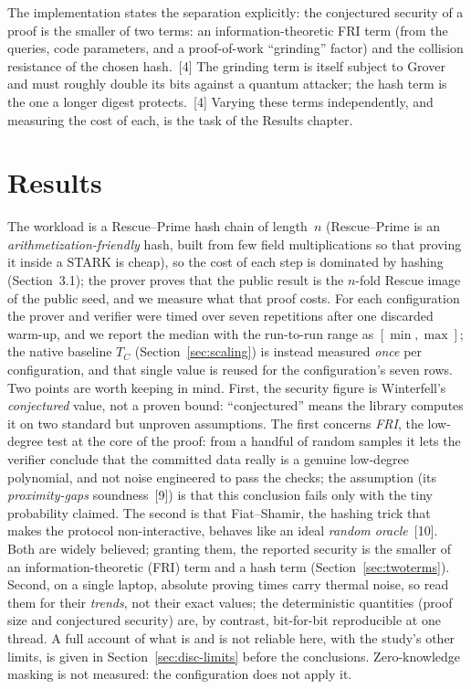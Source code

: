 \documentclass[11pt]{article}
\begin{document}
The implementation states the separation explicitly: the conjectured security of a proof is the smaller
of two terms: an information-theoretic FRI term (from the queries, code parameters, and a proof-of-work
``grinding'' factor) and the collision resistance of the chosen hash.~[4] The grinding term is itself
subject to Grover and must roughly double its bits against a quantum attacker; the hash term is the one a
longer digest protects.~[4] Varying these terms independently, and measuring the cost of each, is the
task of the Results chapter.

\section{Results}
\label{sec:results}

The workload is a Rescue--Prime hash chain of length~$n$ (Rescue--Prime is an
\emph{arithmetization-friendly} hash, built from few field multiplications so that proving it inside a
STARK is cheap), so the cost of each step is dominated by hashing (Section~3.1); the prover proves that the public result is the $n$-fold Rescue image of the
public seed, and we measure what that proof costs. For each configuration the prover and verifier were
timed over seven repetitions after one discarded warm-up, and we report the median with the run-to-run
range as $[\min,\max]$; the native baseline $T_C$ (Section~\ref{sec:scaling}) is instead measured
\emph{once} per configuration, and that single value is reused for the configuration's seven rows. Two points
are worth keeping in mind. First, the security figure is Winterfell's \emph{conjectured} value, not a
proven bound: ``conjectured'' means the library computes it on two standard but unproven assumptions. The
first concerns \emph{FRI}, the low-degree test at the core of the proof: from a handful of random samples
it lets the verifier conclude that the committed data really is a genuine low-degree polynomial, and not
noise engineered to pass the checks; the assumption (its \emph{proximity-gaps} soundness~[9]) is that
this conclusion fails only with the tiny probability claimed. The second is that Fiat--Shamir, the
hashing trick that makes the protocol non-interactive, behaves like an ideal \emph{random oracle}~[10].
Both are widely believed; granting them, the reported security is the smaller of an information-theoretic
(FRI) term and a hash term (Section~\ref{sec:twoterms}). Second, on a single laptop, absolute proving
times carry thermal noise, so read them for their \emph{trends}, not their exact values; the deterministic
quantities (proof size and conjectured security) are, by contrast, bit-for-bit reproducible at one thread.
A full account of what is and is not reliable here, with the study's other limits, is given in
Section~\ref{sec:disc-limits} before the conclusions. Zero-knowledge masking is not measured: the
configuration does not apply it.
\end{document}
